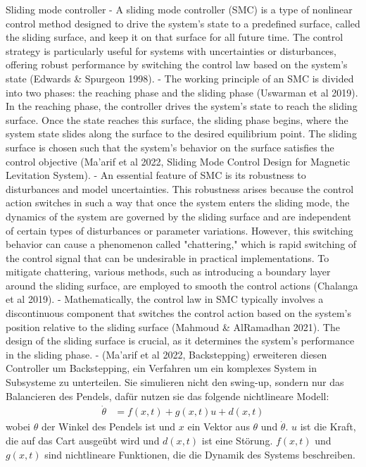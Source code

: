 Sliding mode controller
- A sliding mode controller (SMC) is a type of nonlinear control method designed to drive the system's state to a predefined surface, called the sliding surface, and keep it on that surface for all future time. The control strategy is particularly useful for systems with uncertainties or disturbances, offering robust performance by switching the control law based on the system's state (Edwards & Spurgeon 1998).
- The working principle of an SMC is divided into two phases: the reaching phase and the sliding phase (Uswarman et al 2019). In the reaching phase, the controller drives the system's state to reach the sliding surface. Once the state reaches this surface, the sliding phase begins, where the system state slides along the surface to the desired equilibrium point. The sliding surface is chosen such that the system's behavior on the surface satisfies the control objective (Ma'arif et al 2022, Sliding Mode Control Design for Magnetic Levitation System).
- An essential feature of SMC is its robustness to disturbances and model uncertainties. This robustness arises because the control action switches in such a way that once the system enters the sliding mode, the dynamics of the system are governed by the sliding surface and are independent of certain types of disturbances or parameter variations. However, this switching behavior can cause a phenomenon called "chattering," which is rapid switching of the control signal that can be undesirable in practical implementations. To mitigate chattering, various methods, such as introducing a boundary layer around the sliding surface, are employed to smooth the control actions (Chalanga et al 2019).
- Mathematically, the control law in SMC typically involves a discontinuous component that switches the control action based on the system's position relative to the sliding surface (Mahmoud & AlRamadhan 2021). The design of the sliding surface is crucial, as it determines the system's performance in the sliding phase.
- (Ma'arif et al 2022, Backstepping) erweiteren diesen Controller um Backstepping, ein Verfahren um ein komplexes System in Subsysteme zu unterteilen. Sie simulieren nicht den swing-up, sondern nur das Balancieren des Pendels, dafür nutzen sie das folgende nichtlineare Modell:
\begin{align}
    \dot{\theta} &= f(x,t) + g(x,t)u + d(x,t)
\end{align}
wobei $\theta$ der Winkel des Pendels ist und $x$ ein Vektor aus $\theta$ und $\dot{\theta}$. $u$ ist die Kraft, die auf das Cart ausgeübt wird und $d(x,t)$ ist eine Störung. $f(x,t)$ und $g(x,t)$ sind nichtlineare Funktionen, die die Dynamik des Systems beschreiben.
